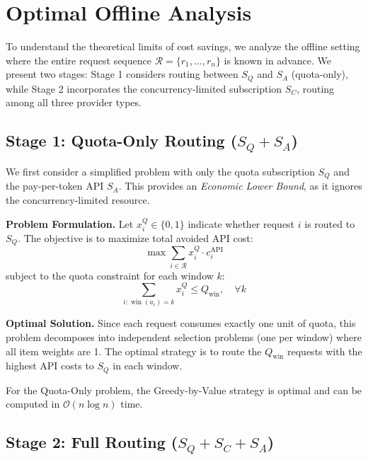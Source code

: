 \section{Optimal Offline Analysis}
\label{sec:offline}

To understand the theoretical limits of cost savings, we analyze the offline setting where the entire request sequence $\mathcal{R} = \{r_1, \dots, r_n\}$ is known in advance. We present two stages: Stage 1 considers routing between $S_Q$ and $S_A$ (quota-only), while Stage 2 incorporates the concurrency-limited subscription $S_C$, routing among all three provider types.

\subsection{Stage 1: Quota-Only Routing ($S_Q + S_A$)}
\label{sec:offline-stage1}

We first consider a simplified problem with only the quota subscription $S_Q$ and the pay-per-token API $S_A$. This provides an \textit{Economic Lower Bound}, as it ignores the concurrency-limited resource.

\textbf{Problem Formulation.}
Let $x_i^Q \in \{0,1\}$ indicate whether request $i$ is routed to $S_Q$. The objective is to maximize total avoided API cost:
\begin{equation}
    \max \sum_{i \in \mathcal{R}} x_i^Q \cdot c_i^{\text{API}}
\end{equation}
subject to the quota constraint for each window $k$:
\begin{equation}
    \sum_{i: \operatorname{win}(a_i)=k} x_i^Q \le Q_{\text{win}}, \quad \forall k
\end{equation}

\textbf{Optimal Solution.}
Since each request consumes exactly one unit of quota, this problem decomposes into independent selection problems (one per window) where all item weights are 1. The optimal strategy is to route the $Q_{\text{win}}$ requests with the highest API costs to $S_Q$ in each window.

\begin{theorem}
For the Quota-Only problem, the Greedy-by-Value strategy is optimal and can be computed in $\mathcal{O}(n \log n)$ time.
\end{theorem}

\subsection{Stage 2: Full Routing ($S_Q + S_C + S_A$)}
\label{sec:offline-stage2}

